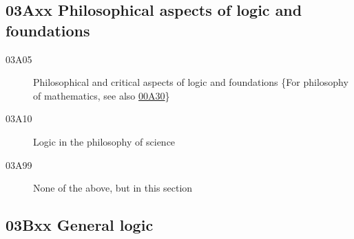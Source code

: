 \subsection*{03Axx  Philosophical aspects of logic and foundations }\label{03Axx}
\begin{description} 
\item [03A05]\label{03A05} Philosophical and critical aspects of logic and foundations \{For philosophy of mathematics, see also \hyperref[00A30]{00A30}\}
\item [03A10]\label{03A10} Logic in the philosophy of science
\item [03A99]\label{03A99} None of the above, but in this section
\end{description}
\subsection*{03Bxx  General logic }\label{03Bxx}
